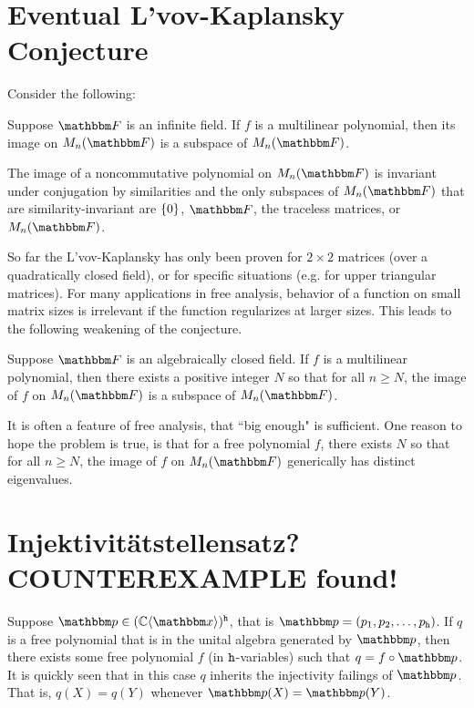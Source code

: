 
\section{Eventual L'vov-Kaplansky Conjecture}
Consider the following:
\begin{conjecture}
	Suppose $\bbF$ is an infinite field.
	If $f$ is a multilinear polynomial, then its image on $M_n(\bbF)$ is a subspace of $M_n(\bbF)$.
\end{conjecture}

The image of a noncommutative polynomial on $M_n(\bbF)$ is invariant under conjugation by similarities and the only subspaces of $M_n(\bbF)$ that are similarity-invariant are ${\left\{0\right\}}$, $\bbF$, the traceless matrices, or $M_n(\bbF)$.

So far the L'vov-Kaplansky has only been proven for $2\times 2$ matrices (over a quadratically closed field), or for specific situations (e.g. for upper triangular matrices).
For many applications in free analysis, behavior of a function on small matrix sizes is irrelevant if the function regularizes at larger sizes.
This leads to the following weakening of the conjecture.

\begin{conjecture}
	Suppose $\bbF$ is an algebraically closed field.
	If $f$ is a multilinear polynomial, then there exists a positive integer $N$ so that for all $n\geq N$, the image of $f$ on $M_n(\bbF)$ is a subspace of $M_n(\bbF)$.
\end{conjecture}

It is often a feature of free analysis, that ``big enough" is sufficient.
One reason to hope the problem is true, is that for a free polynomial $f$, there exists $N$ so that for all $n\geq N$, the image of $f$ on $M_n(\bbF)$ generically has distinct eigenvalues.



\section{Injektivit{\"a}tstellensatz? COUNTEREXAMPLE found!}

Suppose $\bbp\in (\C\fralg{\bbx})^\tth$, that is $\bbp = (p_1,p_2,\dots, p_\tth)$.
If $q$ is a free polynomial that is in the unital algebra generated by $\bbp$, then there exists some free polynomial $f$ (in 
${\texttt{h}}$-variables) such that $q = f\circ \bbp$.
It is quickly seen that in this case $q$ inherits the injectivity failings of $\bbp$.
That is, $q(X) = q(Y)$ whenever $\bbp(X) = \bbp(Y)$.


